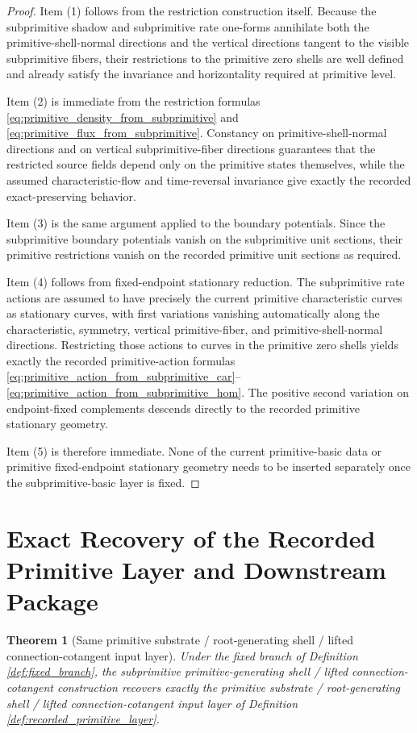 \documentclass[11pt]{article}
\newtheorem{theorem}{Theorem}
\begin{document}
\begin{proof}
Item (1) follows from the restriction construction itself. Because the subprimitive shadow and subprimitive rate one-forms annihilate both the primitive-shell-normal directions and the vertical directions tangent to the visible subprimitive fibers, their restrictions to the primitive zero shells are well defined and already satisfy the invariance and horizontality required at primitive level.

Item (2) is immediate from the restriction formulas \eqref{eq:primitive_density_from_subprimitive} and \eqref{eq:primitive_flux_from_subprimitive}. Constancy on primitive-shell-normal directions and on vertical subprimitive-fiber directions guarantees that the restricted source fields depend only on the primitive states themselves, while the assumed characteristic-flow and time-reversal invariance give exactly the recorded exact-preserving behavior.

Item (3) is the same argument applied to the boundary potentials. Since the subprimitive boundary potentials vanish on the subprimitive unit sections, their primitive restrictions vanish on the recorded primitive unit sections as required.

Item (4) follows from fixed-endpoint stationary reduction. The subprimitive rate actions are assumed to have precisely the current primitive characteristic curves as stationary curves, with first variations vanishing automatically along the characteristic, symmetry, vertical primitive-fiber, and primitive-shell-normal directions. Restricting those actions to curves in the primitive zero shells yields exactly the recorded primitive-action formulas \eqref{eq:primitive_action_from_subprimitive_car}--\eqref{eq:primitive_action_from_subprimitive_hom}. The positive second variation on endpoint-fixed complements descends directly to the recorded primitive stationary geometry.

Item (5) is therefore immediate. None of the current primitive-basic data or primitive fixed-endpoint stationary geometry needs to be inserted separately once the subprimitive-basic layer is fixed.
\end{proof}

\section{Exact Recovery of the Recorded Primitive Layer and Downstream Package}

\begin{theorem}[Same primitive substrate / root-generating shell / lifted connection-cotangent input layer]
\label{thm:same_primitive_input}
Under the fixed branch of Definition \ref{def:fixed_branch}, the subprimitive primitive-generating shell / lifted connection-cotangent construction recovers exactly the primitive substrate / root-generating shell / lifted connection-cotangent input layer of Definition \ref{def:recorded_primitive_layer}.
\end{theorem}
\end{document}
